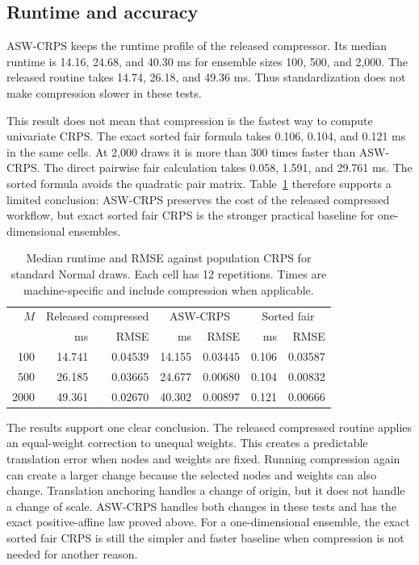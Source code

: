 \documentclass[11pt]{article}
\begin{document}
\FloatBarrier

\subsection{Runtime and accuracy}

ASW-CRPS keeps the runtime profile of the released compressor. Its median runtime is 14.16, 24.68, and 40.30 ms for ensemble sizes 100, 500, and 2,000. The released routine takes 14.74, 26.18, and 49.36 ms. Thus standardization does not make compression slower in these tests.

This result does not mean that compression is the fastest way to compute univariate CRPS. The exact sorted fair formula takes 0.106, 0.104, and 0.121 ms in the same cells. At 2,000 draws it is more than 300 times faster than ASW-CRPS. The direct pairwise fair calculation takes 0.058, 1.591, and 29.761 ms. The sorted formula avoids the quadratic pair matrix. Table~\ref{tab:runtime} therefore supports a limited conclusion: ASW-CRPS preserves the cost of the released compressed workflow, but exact sorted fair CRPS is the stronger practical baseline for one-dimensional ensembles.

\begin{table}[htbp]
\centering
\caption{Median runtime and RMSE against population CRPS for standard Normal draws. Each cell has 12 repetitions. Times are machine-specific and include compression when applicable.}
\label{tab:runtime}
\small
\begin{tabular}{rrrrrrr}
\toprule
$M$ & \multicolumn{2}{c}{Released compressed} & \multicolumn{2}{c}{ASW-CRPS} & \multicolumn{2}{c}{Sorted fair} \\
& ms & RMSE & ms & RMSE & ms & RMSE \\
\midrule
100  & 14.741 & 0.04539 & 14.155 & 0.03445 & 0.106 & 0.03587 \\
500  & 26.185 & 0.03665 & 24.677 & 0.00680 & 0.104 & 0.00832 \\
2000 & 49.361 & 0.02670 & 40.302 & 0.00897 & 0.121 & 0.00666 \\
\bottomrule
\end{tabular}
\end{table}

\FloatBarrier

The results support one clear conclusion. The released compressed routine applies an equal-weight correction to unequal weights. This creates a predictable translation error when nodes and weights are fixed. Running compression again can create a larger change because the selected nodes and weights can also change. Translation anchoring handles a change of origin, but it does not handle a change of scale. ASW-CRPS handles both changes in these tests and has the exact positive-affine law proved above. For a one-dimensional ensemble, the exact sorted fair CRPS is still the simpler and faster baseline when compression is not needed for another reason.
\end{document}
